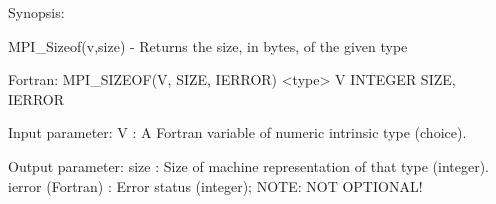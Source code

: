 Synopsis:

MPI_Sizeof(v,size) - Returns the size, in bytes, of the given type

Fortran:
MPI_SIZEOF(V, SIZE, IERROR)
<type>    V
INTEGER    SIZE, IERROR

Input parameter:
V : A Fortran variable of numeric intrinsic type (choice).

Output parameter:
size : Size of machine representation of that type (integer).
ierror (Fortran) : Error status (integer); NOTE: NOT OPTIONAL!


